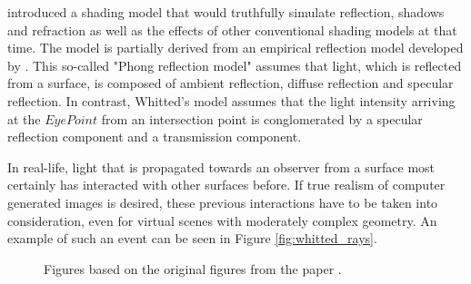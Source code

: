 \cite{whitted1979improved} introduced a shading model that would truthfully simulate reflection, shadows and refraction as well as the effects of other conventional shading models at that time.  
The model is partially derived from an empirical reflection model developed by \cite{phong1975illumination}. This so-called "Phong reflection model" assumes that light, which is reflected from a surface, is composed of ambient reflection, diffuse reflection and specular reflection.
In contrast, Whitted's model assumes that the light intensity arriving at the $Eye Point$ from an intersection point is conglomerated by a specular reflection component and a transmission component. 

In real-life, light that is propagated towards an observer from a surface most certainly has interacted with other surfaces before. If true realism of computer generated images is desired, these previous interactions have to be taken into consideration, even for virtual scenes with moderately complex geometry. An example of such an event can be seen in Figure \ref{fig:whitted_rays}.

\begin{figure}
	\centering
	\hfill
	\caption{Figures based on the original figures from the paper  \cite{whitted1979improved}.}
\end{figure}

